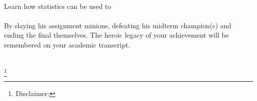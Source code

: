 \documentclass[letterpaper,10pt,twoside,onecolumn,openany]{book}
\begin{document}
\frontmatter                           
\begin{titlepage}
    ~
    
    \newpage
    
    \begin{center}
        

        \large
        \vspace*{\fill}
        Learn how statistics can be used to 
        \\~\\
        By slaying his assignment minions, defeating his midterm champion(s) and ending the final themselves. The heroic legacy of your achievement will be remembered on your academic transcript.
        \\~\\
        \vspace*{\fill}

    \end{center}
    \let\thefootnote\relax\footnote{Disclaimer: }
\end{titlepage}
\tableofcontents
\mainmatter






\end{document}
